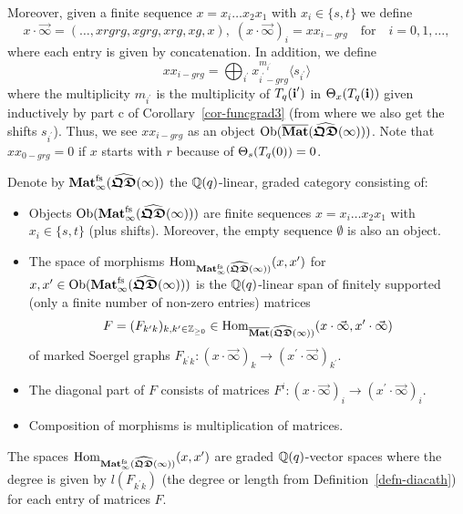 Moreover, given a finite sequence $x=x_i\dots x_2x_1$ with $x_i\in\{s,t\}$ we define
\[
x\cdot \vec{\infty}=(\dots,xrgrg,xgrg,xrg,xg,x),\;(x\cdot \vec{\infty})_i=xx_{i-grg}\quad\text{for}\quad i=0,1,\dots,
\]
where each entry is given by concatenation. In addition, we define
\[
xx_{i-grg}=\bigoplus_{i^{\prime}}x_{i^{\prime}-grg}^{m_{i^{\prime}}}\langle s_{i^{\prime}}\rangle
\]
where the multiplicity 
$m_{i^{\prime}}$ is the 
multiplicity of $T_q({\boldsymbol{\mathrm{i}}^{\prime}})$ in 
$\Theta_x(T_q({\boldsymbol{\mathrm{i}}}))$ given inductively 
by part c of Corollary~\ref{cor-funcgrad3} 
(from where we also get the shifts $s_{i^{\prime}}$). 
Thus, we see $xx_{i-grg}$ as an object 
$\mathrm{Ob}(\overline{\boldsymbol{\mathrm{Mat}}}(\widehat{\boldsymbol{\mathfrak{QD}}}(\infty)))$. Note that 
$xx_{0-grg}=0$ if $x$ starts with $r$ because of $\Theta_s(T_q({0}))=0$.




\begin{defn}\label{defn-diaforend1}
Denote by $\boldsymbol{\mathrm{Mat}}^{\mathrm{fs}}_{\infty}(\widehat{\boldsymbol{\mathfrak{QD}}}(\infty))$ the $\mathbb{Q}(q)$-linear,
 graded category consisting of:
\begin{itemize}
\item Objects $\mathrm{Ob}(\boldsymbol{\mathrm{Mat}}^{\mathrm{fs}}_{\infty}(\widehat{\boldsymbol{\mathfrak{QD}}}(\infty)))$ are 
finite sequences $x=x_i\dots x_2x_1$ 
with $x_i\in\{s,t\}$ (plus shifts). 
Moreover, the empty sequence $\emptyset$ is also an object.



\item The space of morphisms $\mathrm{Hom}_{\boldsymbol{\mathrm{Mat}}^{\mathrm{fs}}_{\infty}(\widehat{\boldsymbol{\mathfrak{QD}}}(\infty))}(x,x^{\prime})$ 
for $x,x^{\prime}\in\mathrm{Ob}(\boldsymbol{\mathrm{Mat}}^{\mathrm{fs}}_{\infty}(\widehat{\boldsymbol{\mathfrak{QD}}}(\infty)))$ is the $\mathbb{Q}(q)$-linear 
span of finitely supported (only a finite number of non-zero entries) matrices
\[
F=(F_{k^{\prime}k})_{k,k^{\prime}\in\mathbb{Z}_{\geq 0}}\in\mathrm{Hom}_{\overline{\boldsymbol{\mathrm{Mat}}}(\widehat{\boldsymbol{\mathfrak{QD}}}(\infty))}(x\cdot \vec{\infty},x^{\prime}\cdot \vec{\infty})
\]
of marked Soergel graphs $F_{k^{\prime}k}\colon (x\cdot \vec{\infty})_k\to (x^{\prime}\cdot \vec{\infty})_{k^{\prime}}$.



\item The diagonal part of $F$ consists 
of matrices $F^i\colon (x\cdot \vec{\infty})_i\to (x^{\prime}\cdot \vec{\infty})_i$.



\item Composition of morphisms is multiplication of matrices.


\end{itemize}
The spaces $\mathrm{Hom}_{\boldsymbol{\mathrm{Mat}}^{\mathrm{fs}}_{\infty}(\widehat{\boldsymbol{\mathfrak{QD}}}(\infty))}(x,x^{\prime})$ 
are graded $\mathbb{Q}(q)$-vector spaces where the degree is 
given by $l(F_{k^{\prime}k})$ (the degree or length 
from Definition~\ref{defn-diacath}) for each entry of matrices $F$.
\end{defn}




